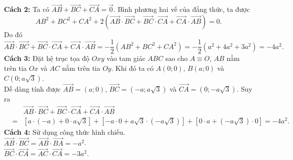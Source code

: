 \begin{vd}
{\begin{enumerate}
{
			      }
			      \textbf{Cách 2:}
			      Ta có $ \overrightarrow{AB}+\overrightarrow{BC}+\overrightarrow{CA}=\overrightarrow{0} $. Bình phương hai vế của đẳng thức, ta được
			      \[ AB^2+BC^2+CA^2+2\left(\overrightarrow{AB}\cdot \overrightarrow{BC} + \overrightarrow{BC}\cdot \overrightarrow{CA} + \overrightarrow{CA}\cdot \overrightarrow{AB} \right)=0.   \]
			      Do đó $$ \overrightarrow{AB}\cdot \overrightarrow{BC} + \overrightarrow{BC}\cdot \overrightarrow{CA} + \overrightarrow{CA}\cdot \overrightarrow{AB}=-\dfrac{1}{2}\left(AB^2+BC^2+CA^2 \right)=-\dfrac{1}{2}\left(a^2+4a^2+3a^2 \right) =-4a^2 .$$
			      \textbf{Cách 3:} Đặt hệ trục tọa độ $ Oxy $ vào tam giác $ ABC $ sao cho $ A\equiv O $, $ AB $ nằm trên tia $ Ox $ và $ AC $ nằm trên tia $ Oy $. Khi đó ta có $ A(0;0) $, $ B(a;0) $ và $ C(0;a\sqrt{3}) $.\\
			      Dễ dàng tính được $ \overrightarrow{AB}=(a;0) $, $ \overrightarrow{BC}=(-a;a\sqrt{3}) $ và $ \overrightarrow{CA}=(0;-a\sqrt{3}) $. Suy ra
			      \begin{eqnarray*}
				      & &\overrightarrow{AB}\cdot \overrightarrow{BC} + \overrightarrow{BC}\cdot \overrightarrow{CA} + \overrightarrow{CA}\cdot \overrightarrow{AB}\\
				      &=&[a\cdot (-a)+0\cdot a\sqrt{3}]+[-a\cdot 0+ a\sqrt{3}\cdot (-a\sqrt{3})]+ [0\cdot a+(-a\sqrt{3})\cdot 0]=-4a^2 .
			      \end{eqnarray*}
			      \textbf{Cách 4:} Sử dụng công thức hình chiếu.\\
			      $ \overrightarrow{AB}\cdot \overrightarrow{BC}=\overrightarrow{AB}\cdot \overrightarrow{BA}=-a^2 $.\\
			      $ \overrightarrow{BC}\cdot \overrightarrow{CA}=\overrightarrow{AC}\cdot \overrightarrow{CA}=-3a^2 $.\\

\end{enumerate}}
\end{vd}
